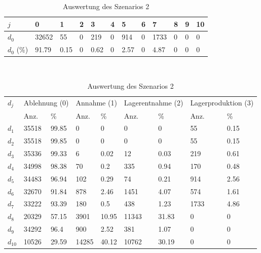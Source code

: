 \begin{table}[h!]
\renewcommand{\arraystretch}{1.5}
  \begin{center}
    \caption{Auswertung des Szenarios 2}  \label{AS2}
    \vspace*{3mm}
    \begin{tabular}{l l l l l l l l l l l l }  \hline 
         $j$ & 0 & 1  & 2 & 3 & 4  & 5 & 6 & 7 & 8 & 9 & 10  \\  \hline
$d_{0}$ &  32652 &  55 &  0 &  219 &  0 &  914 &  0 &  1733 &  0 &  0 &  0 \\
$d_{0}$ (\%)&  91.79 &  0.15 &  0 &  0.62 &  0 &  2.57 &  0 &  4.87 &  0 &  0 &  0 \\
\hline
    \end{tabular} \\[3mm]
        \begin{tabular}{ l l l l l l l l l}   \hline    %
    $d_j$ & \multicolumn{2}{c}{Ablehnung (0)} & \multicolumn{2}{c}{Annahme (1)}  & \multicolumn{2}{c}{Lagerentnahme (2)} & \multicolumn{2}{c}{Lagerproduktion (3)}\\
    & Anz. & \% & Anz. & \% & Anz. & \% & Anz. & \% \\ \hline 
$d_{1}$  &  35518 &  99.85 &    0 &    0 &    0 &    0 &    55 &  0.15 \\
$d_{2}$  &  35518 &  99.85 &    0 &    0 &    0 &    0 &    55 &  0.15 \\
$d_{3}$  &  35336 &  99.33 &      6 &   0.02 &     12 &   0.03 &   219 &  0.61 \\
$d_{4}$  &  34998 &  98.38 &     70 &    0.2 &    335 &   0.94 &   170 &  0.48 \\
$d_{5}$  &  34483 &  96.94 &    102 &   0.29 &     74 &   0.21 &   914 &  2.56 \\
$d_{6}$  &  32670 &  91.84 &    878 &   2.46 &   1451 &   4.07 &   574 &  1.61 \\
$d_{7}$  &  33222 &  93.39 &    180 &    0.5 &    438 &   1.23 &  1733 &  4.86 \\
$d_{8}$  &  20329 &  57.15 &   3901 &  10.95 &  11343 &  31.83 &   0 &   0 \\
$d_{9}$  &  34292 &   96.4 &    900 &   2.52 &    381 &   1.07 &   0 &   0 \\
$d_{10}$ &  10526 &  29.59 &  14285 &  40.12 &  10762 &  30.19 &   0 &   0 \\
          \hline
   \end{tabular} \\[3mm]
     \end{center}
\end{table}

